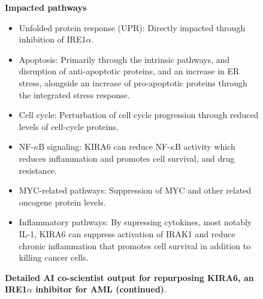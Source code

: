 \begin{figure}[htbp!]
\begin{tcolorbox}[
    colback=black!5!white,
    colframe=black!60!white,
    title=\textbf{KIRA6 for AML (continued)},
    fonttitle=\bfseries,
    arc=3mm,
    boxrule=1pt,
    bottomrule=2pt,
]
\textbf{Impacted pathways}
\begin{itemize}
    \item  Unfolded protein response (UPR): Directly impacted through inhibition of IRE1$\alpha$.
    \item  Apoptosis: Primarily through the intrinsic pathways, and disruption of anti-apoptotic proteins, and an increase in ER stress, alongside an increase of pro-apoptotic proteins through the integrated stress response.
    \item  Cell cycle: Perturbation of cell cycle progression through reduced levels of cell-cycle proteins.
    \item  NF-$\kappa$B signaling: KIRA6 can reduce NF-$\kappa$B activity which reduces inflammation and promotes cell survival, and drug resistance.
    \item  MYC-related pathways: Suppression of MYC and other related oncogene protein levels.
    \item  Inflammatory pathways: By supressing cytokines, most notably IL-1, KIRA6 can suppress activation of IRAK1 and reduce chronic inflammation that promotes cell survival in addition to killing cancer cells.
\end{itemize}

\end{tcolorbox}
\vspace{0.1cm}
\caption{\textbf{Detailed AI co-scientist output for repurposing KIRA6, an IRE1$\alpha$ inhibitor for AML (continued)}.}
\label{fig:ex_kira6_3}
\end{figure}


